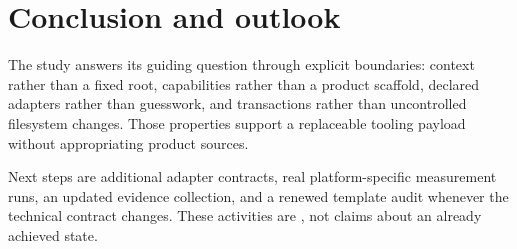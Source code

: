 \section{Conclusion and outlook}
\label{chap:conclusion-outlook}

The study answers its guiding question through explicit boundaries: context rather than a
fixed root, capabilities rather than a product scaffold, declared adapters rather than
guesswork, and transactions rather than uncontrolled filesystem changes. Those properties
support a replaceable tooling payload without appropriating product sources.

Next steps are additional adapter contracts, real platform-specific measurement runs, an
updated evidence collection, and a renewed template audit whenever the technical contract
changes. These activities are \Planned{}, not claims about an already achieved state.
